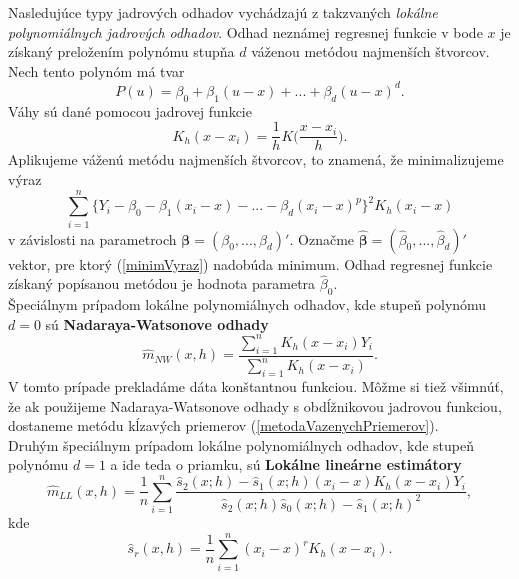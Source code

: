 Nasledujúce typy jadrových odhadov vychádzajú z takzvaných \textit{lokálne polynomiálnych jadrových odhadov}. Odhad neznámej regresnej funkcie v bode $x$ je získaný preložením polynómu stupňa $d$ váženou metódou najmenších štvorcov. Nech tento polynóm má tvar
\begin{equation}
P(u)=\beta_0 + \beta_1(u - x) + ... + \beta_d(u - x)^d.
\end{equation}
Váhy sú dané pomocou jadrovej funkcie 
\begin{equation} \label{jadrovaFunkcia}
K_h(x - x_i) = \frac{1}{h}K\Big(\frac{x-x_i}{h}\Big).
\end{equation}
Aplikujeme váženú metódu najmenších štvorcov, to znamená, že minimalizujeme výraz 
\begin{equation}\label{minimVyraz}
 \sum\limits_{i=1}^{n} \{Y_i - \beta_0 - \beta_1(x_i - x) - ... - \beta_d(x_i - x)^p\}^2 K_h(x_i - x)
\end{equation}
v závislosti na parametroch $\pmb{\beta} = (\beta_0,...,\beta_d)'$. Označme $\pmb{\hat{\beta}} = (\hat{\beta}_0,...,\hat{\beta}_d)'$ vektor, pre ktorý (\ref{minimVyraz}) nadobúda minimum. Odhad regresnej funkcie získaný popísanou metódou  je  hodnota parametra $\hat{\beta}_0$.\\
Špeciálnym prípadom lokálne polynomiálnych odhadov, kde stupeň polynómu $d = 0$ sú \textbf{Nadaraya-Watsonove odhady}
\begin{equation}\label{Nadaraya-Watson}
\hat{m}_{NW}(x,h) = \frac{\sum\limits_{i=1}^{n} K_h(x - x_i)Y_i}{\sum\limits_{i=1}^{n} K_h(x - x_i)}.
\end{equation}
V tomto prípade prekladáme dáta konštantnou funkciou. Môžme si tiež všimnúť, že ak použijeme Nadaraya-Watsonove odhady s obdĺžnikovou jadrovou funkciou, dostaneme metódu kĺzavých priemerov (\ref{metodaVazenychPriemerov}).\\
Druhým špeciálnym prípadom lokálne polynomiálnych odhadov, kde stupeň polynómu $d = 1$ a ide teda o priamku, sú 
 \textbf{Lokálne lineárne estimátory}
\begin{equation}
\hat{m}_{LL}(x,h) = \frac{1}{n}\sum\limits_{i=1}^{n}\frac{{\hat{s}_2(x;h) - \hat{s}_1(x;h)(x_i - x)}K_h(x-x_i)Y_i}{\hat{s}_2(x;h)\hat{s}_0(x;h) - \hat{s}_1(x;h)^2},
\end{equation}
kde 
\begin{equation}
\hat{s}_r(x,h) = \frac{1}{n}\sum\limits_{i=1}^{n}(x_i - x)^rK_h(x-x_i).
\end{equation}




